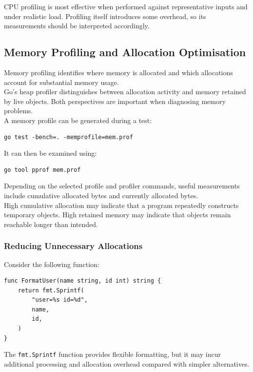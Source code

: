 CPU profiling is most effective when performed against representative inputs and under realistic load. Profiling itself introduces some overhead, so its measurements should be interpreted accordingly.

\subsection{Memory Profiling and Allocation Optimisation}

Memory profiling identifies where memory is allocated and which allocations account for substantial memory usage.\\

Go's heap profiler distinguishes between allocation activity and memory retained by live objects. Both perspectives are important when diagnosing memory problems.\\

A memory profile can be generated during a test:

\begin{lstlisting}
go test -bench=. -memprofile=mem.prof
\end{lstlisting}

It can then be examined using:

\begin{lstlisting}
go tool pprof mem.prof
\end{lstlisting}

Depending on the selected profile and profiler commands, useful measurements include cumulative allocated bytes and currently allocated bytes.\\

High cumulative allocation may indicate that a program repeatedly constructs temporary objects. High retained memory may indicate that objects remain reachable longer than intended.

\subsubsection{Reducing Unnecessary Allocations}

Consider the following function:

\begin{lstlisting}
func FormatUser(name string, id int) string {
    return fmt.Sprintf(
        "user=%s id=%d",
        name,
        id,
    )
}
\end{lstlisting}

The \texttt{fmt.Sprintf} function provides flexible formatting, but it may incur additional processing and allocation overhead compared with simpler alternatives.\\

